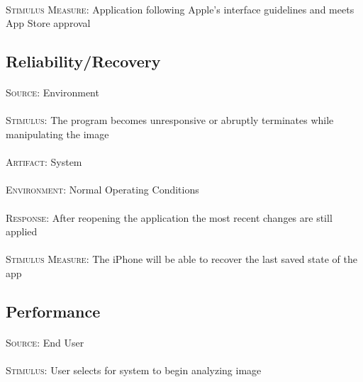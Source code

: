 \paragraph{}\textsc{Stimulus Measure:} Application following Apple's interface guidelines and meets App Store approval

\subsection{Reliability/Recovery}
\paragraph{}\textsc{Source:} Environment
\paragraph{}\textsc{Stimulus:} The program becomes unresponsive or abruptly terminates while manipulating the image
\paragraph{}\textsc{Artifact:} System
\paragraph{}\textsc{Environment:} Normal Operating Conditions
\paragraph{}\textsc{Response:} After reopening the application the most recent changes are still applied
\paragraph{}\textsc{Stimulus Measure:} The iPhone will be able to recover the last saved state of the app

\subsection{Performance}
\paragraph{}\textsc{Source:} End User
\paragraph{}\textsc{Stimulus:} User selects for system to begin analyzing image

